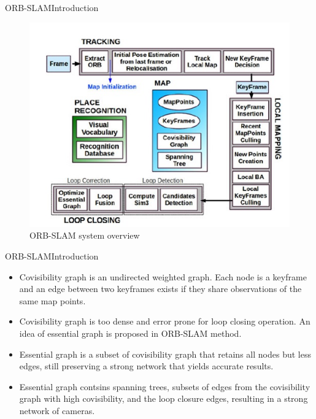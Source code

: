 \documentclass{beamer}
\begin{document}
\begin{frame}{ORB-SLAM}{Introduction}
  \begin{figure}
\includegraphics[scale=0.6]{Figure/ORB-SLAM}
\caption{ORB-SLAM system overview}
\end{figure}
  
\end{frame}

\begin{frame}{ORB-SLAM}{Introduction}
  \begin{itemize}
      \item{
      Covisibility graph is an undirected weighted graph. Each node is a keyframe and an edge between two keyframes exists if they share observations of the same map points.
      }
      \item{
      Covisibility graph is too dense and error prone for loop closing operation. An idea of essential graph is proposed in ORB-SLAM method.
      }
      \item{
      Essential graph is a subset of covisibility graph that retains all nodes but less edges, still preserving a strong network that yields accurate results. 
      }
      \item{
      Essential graph contsins spanning trees, subsets of edges from the covisibility graph with high covisibility, and the loop closure edges, resulting in a strong network of cameras.
      }
  \end{itemize}
\end{frame}
\end{document}
